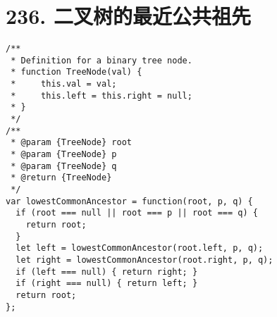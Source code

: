 \newpage
\section{236. 二叉树的最近公共祖先}
\label{leetcode:236}

\begin{verbatim}
/**
 * Definition for a binary tree node.
 * function TreeNode(val) {
 *     this.val = val;
 *     this.left = this.right = null;
 * }
 */
/**
 * @param {TreeNode} root
 * @param {TreeNode} p
 * @param {TreeNode} q
 * @return {TreeNode}
 */
var lowestCommonAncestor = function(root, p, q) {
  if (root === null || root === p || root === q) {
    return root;
  }
  let left = lowestCommonAncestor(root.left, p, q);
  let right = lowestCommonAncestor(root.right, p, q);
  if (left === null) { return right; }
  if (right === null) { return left; }
  return root;
};
\end{verbatim}